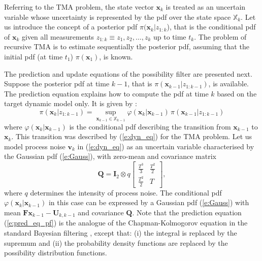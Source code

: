 \documentclass{llncs}
\newcommand{\xb}{\mathbf{x}}
\newcommand{\vb}{\mathbf{v}}
\newcommand{\Fb}{\mathbf{F}}
\newcommand{\Qb}{\mathbf{Q}}
\newcommand{\Ib}{\mathbf{I}}
\newcommand{\Ub}{\mathbf{U}}
\begin{document}
 Referring to the TMA problem, the state vector $\xb_k$ is treated as an uncertain variable whose uncertainty is represented by the pdf over the state space $\mathbb{X}_k$. Let us introduce the concept of a posterior pdf $\pi(\xb_k|z_{1:k}$), that is the conditional pdf of $\xb_k$ given all measurements $z_{1:k}\equiv z_1,z_2,\dots,z_k$ up to time $t_k$.
The problem of recursive TMA is to estimate sequentially the posterior pdf, assuming that the initial pdf (at time $t_1$) $\pi(\xb_1)$, is known.

The prediction and update equations of the possibility filter are presented next. Suppose the posterior pdf at time $k-1$, that is $\pi(\xb_{k-1}|z_{1:k-1})$, is available. The prediction equation explains how to compute the pdf at time $k$ based on the target dynamic model only. It is given by  \cite{houssineau_bishop_17}:
\begin{equation}
\pi(\xb_k|z_{1:k-1}) = \sup\limits_{\xb_{k-1}\in\mathbb{X}_{k-1}} \varphi(\xb_k|\xb_{k-1})\,\pi(\xb_{k-1}|z_{1:k-1})
\label{e:pred_eq_pf}
\end{equation}
where $\varphi(\xb_k|\xb_{k-1})$ is the conditional pdf describing the transition from $\xb_{k-1}$ to $\xb_k$.  This transition was described by (\ref{e:dyn_eq}) for the TMA problem. Let us model process noise $\vb_k$ in (\ref{e:dyn_eq}) as an uncertain variable characterised by the Gaussian pdf  (\ref{e:Gauss}), with zero-mean and covariance matrix
\begin{equation}
\Qb = \Ib_2 \otimes q
\left[\begin{matrix} \frac{T^3}{3} &
\frac{T^2}{2}\\\frac{T^2}{2} & T\end{matrix}\right],
\end{equation}
where $q$ determines the intensity of process noise. The conditional pdf $\varphi(\xb_k|\xb_{k-1})$ in this case can be expressed by a Gaussian pdf (\ref{e:Gauss}) with mean $\Fb\xb_{k-1}-\Ub_{k,k-1}$ and covariance $\Qb$. Note that the prediction equation (\ref{e:pred_eq_pf})  is the analogue
of the Chapman-Kolmogorov equation in the standard
Bayesian filtering \cite{jazwinski_70}, except that: (i) the integral is replaced by the
supremum and (ii) the probability density functions are replaced by the
possibility distribution functions.
\end{document}
